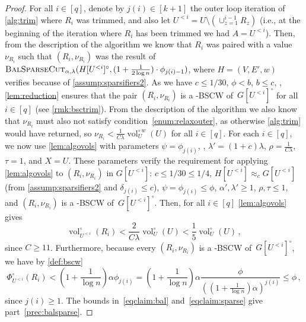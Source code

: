 \documentclass[epsfig,letter,11pt]{article}
\numberwithin{equation}{section}
\newcommand{\unvolc}[2]{\operatorname{vol}_{#2}^\circ (#1)}
\newcommand{\wvolc}[2]{\operatorname{vol}_{#2}^{\circ \,w} (#1)}
\newcommand{\unspc}[2]{\Phi_{#2}^\circ (#1)}
\newcommand{\bsc}{\textsc{BalSparseCut}_{\alpha,\lambda}}
\begin{document}
\begin{proof}
	For all $i \in [q]$, denote by $j(i) \in [k+1]$ the outer loop iteration of \cref{alg:trim} where $R_i$ was trimmed, and also let $U^{<i}=U \setminus (\cup_{z=1}^{i-1} R_z)$ (i.e., at the beginning of the iteration where $R_i$ has been trimmed we had $A = U^{<i}$). Then, from the description of the algorithm we know that $R_i$ was paired with a value $\nu_{R_i}$ such that $(R_i,\nu_{R_i})$ was the result of $\bsc(H[U^{<i}]^\circ, (1+\frac{1}{2\log n}) \cdot \phi_{j(i)-1})$, where $H=(V,E',w)$ verifies  because of \cref{assump:sparsifiers2}. As we have $ c\le 1/30$, $\phi < b$, $b \le c$, , \cref{lem:reduction} ensures that the pair $(R_i,\nu_{R_i})$ is a -BSCW of~$G[U^{<i}]^\circ$ for all $i \in [q]$ (see \cref{rmk:bsctrim}).  From the description of the algorithm  we also know that $\nu_{R_i}$ must also not satisfy condition~\eqref{enum:relaxouter}, as otherwise \cref{alg:trim} would have returned, so $\nu_{R_i} < \frac{1}{C \lambda}\wvolc{U}{U}$ for all $i \in [q]$. For each $i \in [q]$, we now use \cref{lem:algovols} with parameters $\psi=\phi_{j(i)}$, , $\lambda' =(1+c)\lambda$, $\rho = \frac{1}{C\lambda}$, $\tau=1$, and $X=U$. These parameters verify the requirement for applying \cref{lem:algovols} to $(R_i,\nu_{R_i})$ in $G[U^{<i}]$: $ c\le 1/30 \le 1/4$, $H[U^{<i}] \approx_{c} G[U^{<i}]$ (from \cref{assump:sparsifiers2} and $\delta_{j(i)} \le c$), $\psi=\phi_{j(i)}\le \phi$, $\alpha',\lambda' \ge 1$, $\rho,\tau \le 1$, and $(R_i,\nu_{R_i})$ is a -BSCW of~$G[U^{<i}]^\circ$. Then, for all $i \in [q]$ \cref{lem:algovols} gives
	\begin{equation}
		\label{eqclaim:bal}
		\unvolc{R_i}{U^{<i}} < \frac{2}{C\lambda}\unvolc{U}{U} < \frac{1}{5}\unvolc{U}{U}\, ,
	\end{equation}
	since $C \ge 11$.
	Furthermore, because every $(R_i,\nu_{R_i})$ is a -BSCW of~$G[U^{<i}]^\circ$, we have by \cref{def:bscw}
	\begin{equation}
		\label{eqclaim:sparse}
		\unspc{R_i}{U^{<i}} < \left(1+\frac{1}{ \log n}\right) \alpha \phi_{j(i)} = \left(1+\frac{1}{ \log n}\right) \alpha \frac{\phi}{\left( \left(1+\frac{1}{ \log n}\right) \alpha\right)^{j(i)}}  \le \phi \, ,
	\end{equation}
	since $j(i) \ge 1$. The bounds in~\eqref{eqclaim:bal} and~\eqref{eqclaim:sparse} give part~\eqref{prec:balsparse}.
\end{proof}
\end{document}
